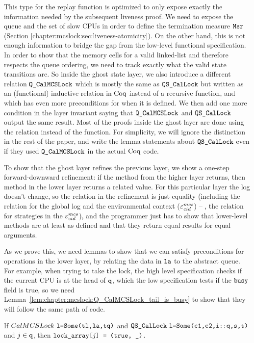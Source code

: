 This type for the replay function is optimized to only expose exactly the information needed by the subsequent liveness proof. 
We need to expose the queue and the set of slow CPUs in order to define the termination measure ${\mathrm{\texttt{Msr}}}$
 (Section \ref{chapter:mcslock:sec:liveness-atomicity}). 
 On the other hand, this is not enough information to bridge the gap from the low-level functional specification. 
 In order to show that the memory cells for a valid linked-list and therefore respects the queue
ordering, we need to track exactly what the valid state transitions are. So inside the ghost state layer, 
we also introduce a different relation  ${\mathrm{\texttt{Q\_CalMCSLock}}}$
which is mostly the same as ${\mathrm{\texttt{QS\_CalLock}}}$ but written as an (functional) inductive relation 
in $\mathrm{Coq}$ instead of a recursive function, and which has even more preconditions for when it is defined. 
We then add one more condition in the layer invariant saying that ${\mathrm{\texttt{Q\_CalMCSLock}}}$ and ${\mathrm{\texttt{QS\_CalLock}}}$ output the same
result. Most of the proofs inside the ghost layer are done using the relation instead of the function.
For simplicity, we will ignore the distinction in the rest of the paper, 
and write the lemma statements about ${\mathrm{\texttt{QS\_CalLock}}}$ even if they used ${\mathrm{\texttt{Q\_CalMCSLock}}}$ in the actual $\mathrm{Coq}$ code.


To show that the ghost layer refines the previous layer, we show a
one-step forward-downward refinement: if the method from the higher
layer returns, then method in the lower layer returns a related
value. For this particular layer the log doesn't change, so the
relation in the refinement is just equality (including the relation for the global log and the environmental context (${\varepsilon}^{mcs}_{cid}$) -- \ie, the relation for strategies in the ${\varepsilon}^{mcs}_{cid}$), 
and the programmer just
has to show that  lower-level methods are at least as defined and
that they return equal results for equal arguments.


As we prove this, we need lemmas to show that we can satisfy preconditions for operations in the lower layer, by relating the data in ${\mathrm{\texttt{la}}}$ to the abstract queue.  For example, when trying to take the lock, the high level specification checks if the current CPU is at the head of ${\mathrm{\texttt{q}}}$, which the low specification tests if the ${\mathrm{\texttt{busy}}}$ field is true, so we need Lemma~\ref{lem:chapter:mcslock:Q_CalMCSLock_tail_is_busy} to show that they will follow the same path of code. 


\begin{lemma}
\label{lem:chapter:mcslock:Q_CalMCSLock_tail_is_busy}

    If $CalMCSLock\ \codeinmath{l=}\Some\codeinmath{(tl,la,tq)}$ and 
    $\QSCalLock\ \codeinmath{l=}\Some\codeinmath{(c1,c2,i::q,s,t)}$ and $j \in{\mathrm{\texttt{q}}}$, then ${\mathrm{\texttt{lock\_array[}}}j{\mathrm{\texttt{] = (true, \_)}}}$.
\end{lemma}

